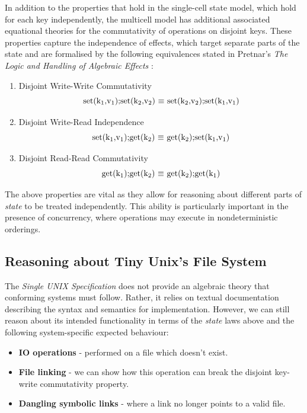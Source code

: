 \documentclass[logo,bsc,singlespacing,parskip]{infthesis}
\begin{document}
In addition to the properties that hold in the single-cell state model, which hold for each key independently,  the multicell model has additional associated equational theories for the commutativity of operations on disjoint keys. These properties capture the independence of effects, which target separate parts of the state and are formalised by the following equivalences stated in Pretnar's \textit{The Logic and Handling of
Algebraic Effects} \cite{Pretnar:2010}:
\begin{enumerate}
    \item Disjoint Write-Write Commutativity \[ \text{set(k\textsubscript{1},v\textsubscript{1});set(k\textsubscript{2},v\textsubscript{2}) $\equiv$ set(k\textsubscript{2},v\textsubscript{2});set(k\textsubscript{1},v\textsubscript{1})} \] 
    \item Disjoint Write-Read Independence \[ \text{set(k\textsubscript{1},v\textsubscript{1});get(k\textsubscript{2}) $\equiv$ get(k\textsubscript{2});set(k\textsubscript{1},v\textsubscript{1})} \] 
    \item Disjoint Read-Read Commutativity \[\text{get(k\textsubscript{1});get(k\textsubscript{2}) $\equiv$ get(k\textsubscript{2});get(k\textsubscript{1})} \] 
\end{enumerate}

The above properties are vital as they allow for reasoning about different parts of \textit{state} to be treated independently. This ability is particularly important in the presence of concurrency, where operations may execute in nondeterministic orderings.


\subsection{Reasoning about Tiny Unix's File System}

The \textit{Single UNIX Specification} \cite{SUSv4} does not provide an algebraic theory that conforming systems must follow. Rather, it relies on textual documentation describing the syntax and semantics for implementation. However, we can still reason about its intended functionality in terms of the \textit{state} laws above and the following system-specific expected behaviour:

\begin{itemize}
    \item \textbf{IO operations} - performed on a file which doesn't exist.
    \item \textbf{File linking} - we can show how this operation can break the disjoint key-write commutativity property.
    \item \textbf{Dangling symbolic links} - where a link no longer points to a valid file.
\end{itemize}
\end{document}
